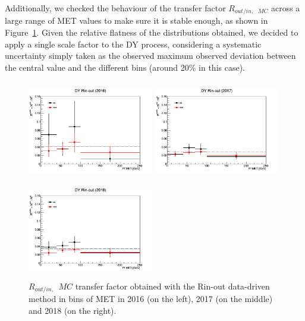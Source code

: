 \documentclass[a4paper, 10pt, openright]{report}
\begin{document}
Additionally, we checked the behaviour of the transfer factor $R_{out/in,\text{ } MC}$ across a large range of \ac{MET} values to make sure it is stable enough, as shown in Figure~\ref{fig:Rinoutcheck}. Given the relative flatness of the distributions obtained, we decided to apply a single scale factor to the \ac{DY} process, considering a systematic uncertainty simply taken as the observed maximum observed deviation between the central value and the different bins (around 20\% in this case).

\begin{figure}[htbp]
\begin{center}
\begin{minipage}[b]{.32\textwidth}
\includegraphics[width=5.5cm, height=4.3cm]{figs/Rinout2016.png}
\end{minipage} \hfill
\begin{minipage}[b]{.32\textwidth}
\includegraphics[width=5.5cm, height=4.3cm]{figs/Rinout2017.png}
\end{minipage} \hfill
\begin{minipage}[b]{.32\textwidth}
\includegraphics[width=5.5cm, height=4.3cm]{figs/Rinout2018.png}
\end{minipage} \hfill
\caption{$R_{out/in,\text{ }} MC$ transfer factor obtained with the Rin-out data-driven method in bins of \ac{MET} in 2016 (on the left), 2017 (on the middle) and 2018 (on the right).}
\label{fig:Rinoutcheck}
\end{center}
\end{figure}
\end{document}
